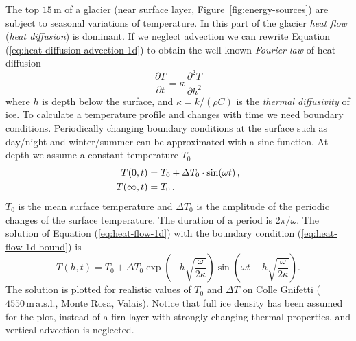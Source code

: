 \documentclass[11pt,a4paper,halfparskip]{scrartcl}
\newcommand{\unit}[1]{\ensuremath{\,\mathrm{#1}}}
\newcommand{\s}[1]{\ensuremath{\,\mathrm{#1}}}
\newcommand{\ddt}[1]{\ensuremath{\frac{\partial #1}{\partial t}}}
\begin{document}
The top $15\s{m}$ of a glacier (near surface layer, Figure~\ref{fig:energy-sources}) are subject to seasonal variations of
temperature. In this part of the glacier \emph{heat flow} (\emph{heat
 diffusion}) is dominant.  If we neglect advection we can rewrite Equation
(\ref{eq:heat-diffusion-advection-1d}) to obtain the well known \emph{Fourier
 law} of heat diffusion
%
\begin{equation}
 \label{eq:heat-flow-1d}
  \ddt{T} = \kappa \, \frac{\partial^2T}{\partial h^2}
\end{equation}
%
where $h$ is depth below the surface, and $\kappa=k/(\rho C)$ is the
\emph{thermal diffusivity} of ice.  To calculate a temperature profile and
changes with time we need boundary conditions.  Periodically changing
boundary conditions at the surface such as day/night and winter/summer can be
approximated with a sine function.  At depth we assume a constant temperature
$T_0$
%
\begin{align}
 \label{eq:heat-flow-1d-bound}
  T(0,t)      &= T_0 + \Delta T_0 \cdot \sin(\omega t)\,,  \notag\\
  T(\infty,t) &= T_0\,.
\end{align}
%
$T_0$ is the mean surface temperature and $\Delta T_0$ is the amplitude of the
periodic changes of the surface temperature.  The duration of a period is
$2\pi/\omega$.  The solution of Equation (\ref{eq:heat-flow-1d}) with the
boundary condition (\ref{eq:heat-flow-1d-bound}) is
%
\begin{equation}
 \label{eq:heat-flow-1d-solution}
  T(h,t) = T_0 + \Delta T_0 \exp\left(-h \sqrt{\frac{\omega}{2\kappa}}\right)
           \sin\left(\omega t - h \sqrt{\frac{\omega}{2\kappa}}\right).
\end{equation}
%
The solution is plotted for realistic values of $T_0$ and $\Delta T$ on Colle
Gnifetti ($4550\unit{m} \unit{a.s.l.}$, Monte Rosa, Valais).  Notice that full
ice density has been assumed for the plot, instead of a firn layer with
strongly changing thermal properties, and vertical advection is neglected.
%
\end{document}
